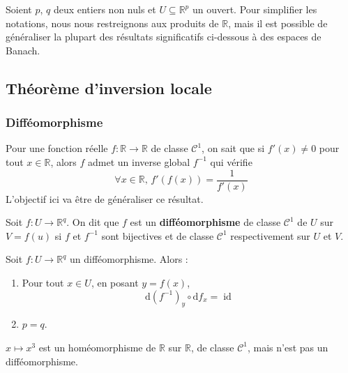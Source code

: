 



	
	Soient $p$, $q$ deux entiers non nuls et $U \subseteq \mathbb{R}^p$ un ouvert. Pour simplifier les notations, nous nous restreignons aux produits de $\mathbb{R}$, mais il est possible de généraliser la plupart des résultats significatifs ci-dessous à des espaces de Banach.
	
	\subsection{Théorème d'inversion locale}
	
	\subsubsection{Difféomorphisme}
	
	
	Pour une fonction réelle $f : \mathbb{R} \rightarrow \mathbb{R}$ de classe $\mathcal{C}^1$, on sait que si $f'(x) \neq 0$ pour tout $x \in \mathbb{R}$, alors $f$ admet un inverse global $f^{-1}$ qui vérifie
	\[ \forall x \in \mathbb{R}, \, f'(f(x)) = \frac{1}{f'(x)} \]
	L'objectif ici va être de généraliser ce résultat.
	
	
	\begin{definition}
		Soit $f : U \rightarrow \mathbb{R}^q$. On dit que $f$ est un \textbf{difféomorphisme} de classe $\mathcal{C}^1$ de $U$ sur $V = f(u)$ si $f$ et $f^{-1}$ sont bijectives et de classe $\mathcal{C}^1$ respectivement sur $U$ et $V$.
	\end{definition}
	
	\begin{proposition}
		Soit $f : U \rightarrow \mathbb{R}^q$ un difféomorphisme. Alors :
		\begin{enumerate}[label=(\roman*)]
			\item Pour tout $x \in U$, en posant $y = f(x)$,
			\[ \mathrm{d}(f^{-1})_y \circ \mathrm{d}f_x = \operatorname{id} \]
			\item $p=q$.
		\end{enumerate}
	\end{proposition}
	
	\begin{example}
		$x \mapsto x^3$ est un homéomorphisme de $\mathbb{R}$ sur $\mathbb{R}$, de classe $\mathcal{C}^1$, mais n'est pas un difféomorphisme.
	\end{example}
	
